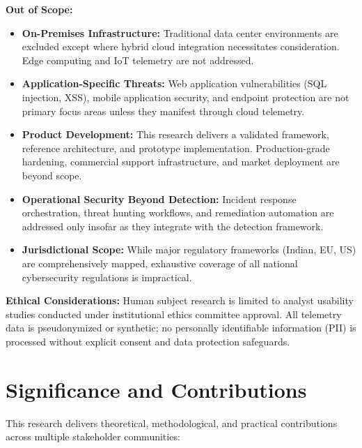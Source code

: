 \textbf{Out of Scope:}
\begin{itemize}
    \item \textbf{On-Premises Infrastructure:} Traditional data center environments are excluded except where hybrid cloud integration necessitates consideration. Edge computing and IoT telemetry are not addressed.
    \item \textbf{Application-Specific Threats:} Web application vulnerabilities (SQL injection, XSS), mobile application security, and endpoint protection are not primary focus areas unless they manifest through cloud telemetry.
    \item \textbf{Product Development:} This research delivers a validated framework, reference architecture, and prototype implementation. Production-grade hardening, commercial support infrastructure, and market deployment are beyond scope.
    \item \textbf{Operational Security Beyond Detection:} Incident response orchestration, threat hunting workflows, and remediation automation are addressed only insofar as they integrate with the detection framework.
    \item \textbf{Jurisdictional Scope:} While major regulatory frameworks (Indian, EU, US) are comprehensively mapped, exhaustive coverage of all national cybersecurity regulations is impractical.
\end{itemize}

\textbf{Ethical Considerations:} Human subject research is limited to analyst usability studies conducted under institutional ethics committee approval. All telemetry data is pseudonymized or synthetic; no personally identifiable information (PII) is processed without explicit consent and data protection safeguards.

\section{Significance and Contributions}\label{sec:intro-significance}
This research delivers theoretical, methodological, and practical contributions across multiple stakeholder communities:

